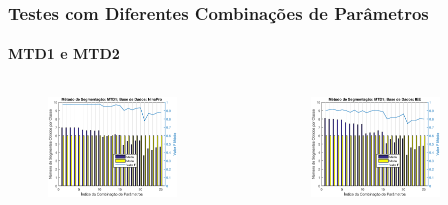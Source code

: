 \documentclass{beamer}
\begin{document}
	\begin{frame}
		\frametitle{Testes com Diferentes Combinações de Parâmetros}
		\framesubtitle{MTD1 e MTD2}
		\begin{columns}[c]
		
			\begin{figure}
				\begin{center}
					\includegraphics[width=0.8\textwidth]{./img/mtd1_nina.eps}
				\end{center}
			\end{figure}
			\begin{figure}
				\begin{center}
					\includegraphics[width=0.8\textwidth]{./img/mtd1_iee.eps}
				\end{center}
			\end{figure}
			

\end{columns}
\end{frame}
\end{document}
